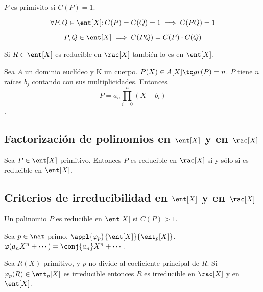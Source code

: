 \documentclass[nochap]{apuntes}
\begin{document}
\begin{defn}[Primitivo] $P$ es primivito si $C(P) = 1$.\end{defn}

\begin{lemma}\[\forall P,Q\in \ent [X] ; C(P)=C(Q)=1 \implies C(PQ) = 1 \]\end{lemma} 

\begin{lemma} \[P,Q\in \ent [X] \implies C(PQ) = C(P) \cdot C(Q)\]\end{lemma}

\begin{remark} Si $R\in \ent [X]$ es reducible en $\rac [X]$ también lo es en $\ent [X]$.\end{remark}

\begin{theorem}
Sea $A$ un dominio euclídeo y $\mathrm{K}$ un cuerpo. $P(X) \in A[X] \tq gr(P) =n$. $P$ tiene $n$ raíces $b_j$ contando con sus multiplicidades. Entonces \[P=a_n \prod_{i=0}^n (X-b_i)\].
\end{theorem}

\subsection{Factorización de polinomios en $\ent [X]$ y en $\rac [X]$}

\begin{theorem}
Sea $P \in \ent [X]$ primitivo. Entonces $P$ es reducible en $\rac [X]$ si y sólo si es reducible en $\ent [X]$.
\end{theorem}

\subsection{Criterios de irreducibilidad en $\ent [X]$ y en $\rac[X]$}

\begin{remark} Un polinomio $P$ es reducible en $\ent [X]$ si $C(P) > 1$.\end{remark}

\begin{defn} Sea $p\in \nat$ primo. $\appl{\varphi_p}{\ent[X]}{\ent_p [X]}$. $\varphi(a_nX^n+\cdots)=\conj{a_n}X^n+\cdots$.\end{defn}

\begin{theorem}
Sea $R(X)$ primitivo, y $p$ no divide al coeficiente principal de $R$. Si $\varphi_p(R)\in \ent_p [X]$ es irreducible entonces $R$ es irreducible en $\rac[X]$ y en $\ent[X]$.
\end{theorem}
\end{document}
